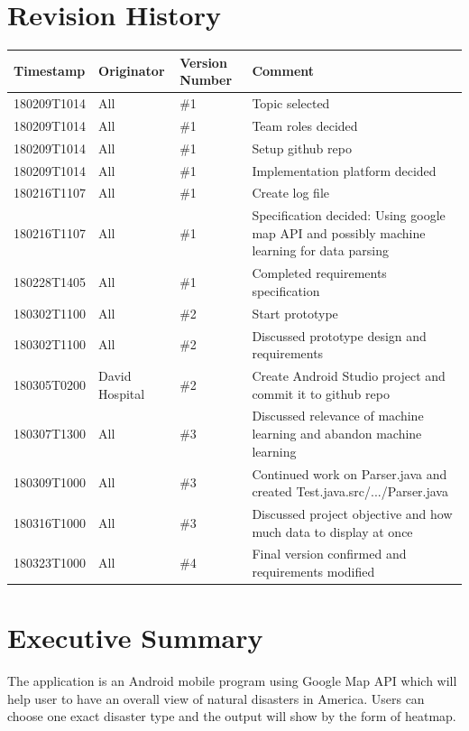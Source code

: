 \documentclass[12pt]{article}
\begin{document}
\section{Revision History}
\begin{tabular}{|p{3cm}|p{3cm}|p{3cm}|p{5cm}|}
\hline
\textbf{Timestamp} & \textbf{Originator}& \textbf{Version Number } & \textbf{Comment}\\
\hline
180209T1014	&All	& \#1	&Topic selected\\
\hline
180209T1014	&All	&\#1	&Team roles decided\\
\hline
180209T1014	&All	&\#1	&Setup github repo\\
\hline
180209T1014	&All	&\#1	&Implementation platform decided\\
\hline
180216T1107	&All	&\#1	&Create log file\\
\hline
180216T1107	&All	&\#1	&Specification decided: Using google map API and possibly machine learning for data parsing\\
\hline
180228T1405	&All	&\#1	&Completed requirements specification\\
\hline
180302T1100	&All	&\#2	&Start prototype\\
\hline
180302T1100	&All	&\#2	&Discussed prototype design and requirements\\
\hline
180305T0200	&David Hospital	&\#2&	Create Android Studio project and commit it to github repo\\
\hline
180307T1300	&All	&\#3	&Discussed relevance of machine learning and abandon machine learning\\
\hline
180309T1000	&All	&\#3	&Continued work on Parser.java and created Test.java.src/.../Parser.java\\
\hline
180316T1000	&All	&\#3	&Discussed project objective and how much data to display at once\\
\hline
180323T1000	&All	&\#4&	Final version confirmed and requirements modified\\
\hline
\end{tabular}

\newpage
\section{Executive Summary}

The application is an Android mobile program using Google Map API which will help user to have an overall view of natural disasters in America. Users can choose one exact disaster type and the output will show by the form of heatmap.
\end{document}
